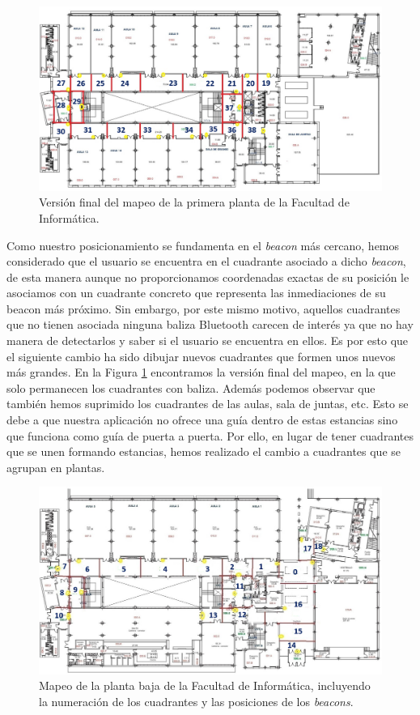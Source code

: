 \begin{figure}[t]
	\centering
	\includegraphics[width=1\textwidth]{Imagenes/Descripciondeltrabajo/mapeoPlanta1}
	\caption{Versión final del mapeo de la primera planta de la Facultad de Informática.}
	\label{fig:cuadrantesP1_v3}
\end{figure}


Como nuestro posicionamiento se fundamenta en el \textit{beacon} más cercano, hemos considerado que el usuario se encuentra en el cuadrante asociado a dicho \textit{beacon}, de esta manera aunque no proporcionamos coordenadas exactas de su posición le asociamos con un cuadrante concreto que representa las inmediaciones de su beacon más próximo. Sin embargo, por este mismo motivo, aquellos cuadrantes que no tienen asociada ninguna baliza Bluetooth carecen de interés ya que no hay manera de detectarlos y saber si el usuario se encuentra en ellos. Es por esto que el siguiente cambio ha sido dibujar nuevos cuadrantes que formen unos nuevos más grandes. En la Figura \ref{fig:cuadrantesP1_v3} encontramos la versión final del mapeo, en la que solo permanecen los cuadrantes con baliza. Además podemos observar que también hemos suprimido los cuadrantes de las aulas, sala de juntas, etc. Esto se debe a que nuestra aplicación no ofrece una guía dentro de estas estancias sino que funciona como guía de puerta a puerta. Por ello, en lugar de tener cuadrantes que se unen formando estancias, hemos realizado el cambio a cuadrantes que se agrupan en plantas.

\begin{figure}[t]
	\centering
	\includegraphics[width=1\textwidth]{Imagenes/Descripciondeltrabajo/mapeoPlantaBaja}
	\caption{Mapeo de la planta baja de la Facultad de Informática, incluyendo la numeración de los cuadrantes y las posiciones de los \textit{beacons}.}
	\label{fig:cuadrantesPbaja}
\end{figure}


